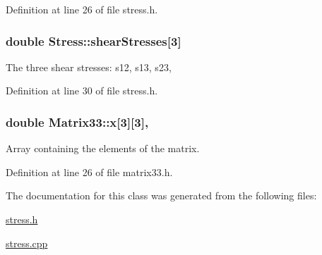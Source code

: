 Definition at line 26 of file stress.\-h.

\hypertarget{classStress_a77e8705e56c2fb56826a638edf3f78bf}{
\subsubsection[{shear\-Stresses}]{\setlength{\rightskip}{0pt plus 5cm}double Stress\-::shear\-Stresses\mbox{[}3\mbox{]}\hspace{0.3cm}{\ttfamily [protected]}}}\label{d1/d1c/classStress_a77e8705e56c2fb56826a638edf3f78bf}
The three shear stresses\-: s12, s13, s23, 

Definition at line 30 of file stress.\-h.

\hypertarget{classMatrix33_af7f01fa466616eb7c8eda2e4d9f85cdd}{
\subsubsection[{x}]{\setlength{\rightskip}{0pt plus 5cm}double Matrix33\-::x\mbox{[}3\mbox{]}\mbox{[}3\mbox{]}\hspace{0.3cm}{\ttfamily [protected]}, {\ttfamily [inherited]}}}\label{de/d82/classMatrix33_af7f01fa466616eb7c8eda2e4d9f85cdd}
Array containing the elements of the matrix. 

Definition at line 26 of file matrix33.\-h.



The documentation for this class was generated from the following files\-:\begin{DoxyCompactItemize}
\item 
\hyperlink{stress_8h}{stress.\-h}\item 
\hyperlink{stress_8cpp}{stress.\-cpp}\end{DoxyCompactItemize}
